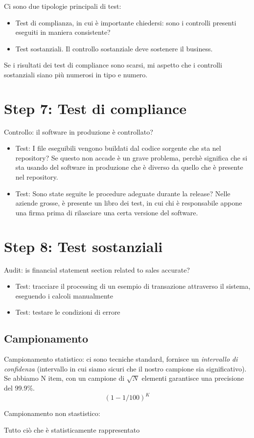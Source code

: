 Ci sono due tipologie principali di test:
\begin{itemize}
\item Test di complianza, in cui è importante chiedersi: sono i controlli 
presenti eseguiti in maniera consistente?
\item Test sostanziali. Il controllo sostanziale deve sostenere il business. 
\end{itemize}


Se i risultati dei test di compliance sono scarsi, mi aspetto che i controlli 
sostanziali siano più numerosi in tipo e numero.

\section{Step 7: Test di compliance}

Controllo: il software in produzione è controllato?
\begin{itemize}
\item Test: I file eseguibili vengono buildati dal codice sorgente che sta nel 
repository? Se questo non accade è un grave problema, perchè significa che si 
sta usando del software in produzione che è diverso da quello che è presente 
nel repository.
\item Test: Sono state seguite le procedure adeguate durante la release? Nelle 
aziende grosse, è presente un libro dei test, in cui chi è responsabile appone 
una firma prima di rilasciare una certa versione del software.
\end{itemize}


\section{Step 8: Test sostanziali}

Audit: is financial statement section related to sales accurate? 

\begin{itemize}
\item Test: tracciare il processing di un esempio di transazione attraverso il 
sistema, eseguendo i calcoli manualmente
\item Test: testare le condizioni di errore
\end{itemize}



\subsection{Campionamento}

Campionamento statistico: ci sono tecniche standard, fornisce un 
\textit{intervallo di confidenza} (intervallo in cui siamo sicuri che il nostro 
campione sia significativo). Se abbiamo N item, con un campione di $\sqrt{N}$ 
elementi garantisce una precisione del 99.9\%.
$$
(1 - 1/100)^K
$$

Campionamento non stastistico:

Tutto ciò che è statisticamente rappresentato
